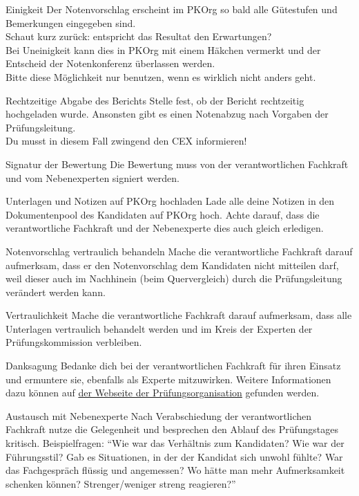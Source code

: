 \begin{taskitemwithoutcomment}{Einigkeit}
  Der Notenvorschlag erscheint im PKOrg so bald alle Gütestufen und Bemerkungen eingegeben sind.\\Schaut kurz zurück: entspricht das Resultat den Erwartungen?\\Bei Uneinigkeit kann dies in PKOrg mit einem Häkchen vermerkt und der Entscheid der Notenkonferenz überlassen werden.\\Bitte diese Möglichkeit nur benutzen, wenn es wirklich nicht anders geht.
\end{taskitemwithoutcomment}
\begin{taskitem}{Rechtzeitige Abgabe des Berichts}
  Stelle fest, ob der Bericht rechtzeitig hochgeladen wurde. Ansonsten gibt es einen Notenabzug nach Vorgaben der Prüfungsleitung.\\Du musst in diesem Fall zwingend den CEX informieren!
\end{taskitem}
\begin{taskitemwithoutcomment}{Signatur der Bewertung}
  Die Bewertung muss von der verantwortlichen Fachkraft und vom Nebenexperten signiert werden.
\end{taskitemwithoutcomment}
\newpage
\begin{taskitemwithoutcomment}{Unterlagen und Notizen auf PKOrg hochladen}
  Lade alle deine Notizen in den Dokumentenpool des Kandidaten auf PKOrg hoch. Achte darauf, dass die verantwortliche Fachkraft und der Nebenexperte dies auch gleich erledigen.
\end{taskitemwithoutcomment}
\begin{taskitemwithoutcomment}{Notenvorschlag vertraulich behandeln}
  Mache die verantwortliche Fachkraft darauf aufmerksam, dass er den Notenvorschlag dem Kandidaten nicht mitteilen darf, weil dieser auch im Nachhinein (beim Quervergleich) durch die Prüfungsleitung verändert werden kann.
\end{taskitemwithoutcomment}
\begin{taskitemwithoutcomment}{Vertraulichkeit}
  Mache die verantwortliche Fachkraft darauf aufmerksam, dass alle Unterlagen vertraulich behandelt werden und im Kreis der Experten der Prüfungskommission verbleiben.
\end{taskitemwithoutcomment}
\begin{taskitemwithoutcomment}{Danksagung}
  Bedanke dich bei der verantwortlichen Fachkraft für ihren Einsatz und ermuntere sie, ebenfalls als Experte mitzuwirken. Weitere Informationen dazu können auf \href{https://pk19.ch}{der Webseite der Prüfungsorganisation} gefunden werden.
\end{taskitemwithoutcomment}
\begin{taskitem}{Austausch mit Nebenexperte}
  Nach Verabschiedung der verantwortlichen Fachkraft nutze die Gelegenheit und besprechen den Ablauf des Prüfungstages kritisch. Beispielfragen: \enquote{Wie war das Verhältnis zum Kandidaten? Wie war der Führungsstil? Gab es Situationen, in der der Kandidat sich unwohl fühlte? War das Fachgespräch flüssig und angemessen? Wo hätte man mehr Aufmerksamkeit schenken können? Strenger/weniger streng reagieren?}
\end{taskitem}
